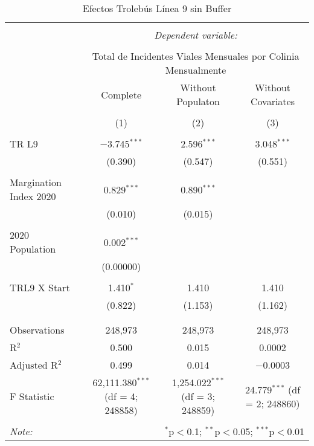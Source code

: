 
\begin{table}[!htbp] \centering 
  \caption{Efectos Trolebús Línea 9 sin Buffer} 
  \label{} 
\begin{tabular}{@{\extracolsep{5pt}}lccc} 
\\[-1.8ex]\hline 
\hline \\[-1.8ex] 
 & \multicolumn{3}{c}{\textit{Dependent variable:}} \\ 
\cline{2-4} 
\\[-1.8ex] & \multicolumn{3}{c}{Total de Incidentes Viales Mensuales por Colinia Mensualmente} \\ 
 & Complete & Without Populaton & Without Covariates \\ 
\\[-1.8ex] & (1) & (2) & (3)\\ 
\hline \\[-1.8ex] 
 TR L9 & $-$3.745$^{***}$ & 2.596$^{***}$ & 3.048$^{***}$ \\ 
  & (0.390) & (0.547) & (0.551) \\ 
  & & & \\ 
 Margination Index 2020 & 0.829$^{***}$ & 0.890$^{***}$ &  \\ 
  & (0.010) & (0.015) &  \\ 
  & & & \\ 
 2020 Population & 0.002$^{***}$ &  &  \\ 
  & (0.00000) &  &  \\ 
  & & & \\ 
 TRL9 X Start & 1.410$^{*}$ & 1.410 & 1.410 \\ 
  & (0.822) & (1.153) & (1.162) \\ 
  & & & \\ 
\hline \\[-1.8ex] 
Observations & 248,973 & 248,973 & 248,973 \\ 
R$^{2}$ & 0.500 & 0.015 & 0.0002 \\ 
Adjusted R$^{2}$ & 0.499 & 0.014 & $-$0.0003 \\ 
F Statistic & 62,111.380$^{***}$ (df = 4; 248858) & 1,254.022$^{***}$ (df = 3; 248859) & 24.779$^{***}$ (df = 2; 248860) \\ 
\hline 
\hline \\[-1.8ex] 
\textit{Note:}  & \multicolumn{3}{r}{$^{*}$p$<$0.1; $^{**}$p$<$0.05; $^{***}$p$<$0.01} \\ 
\end{tabular} 
\end{table} 
